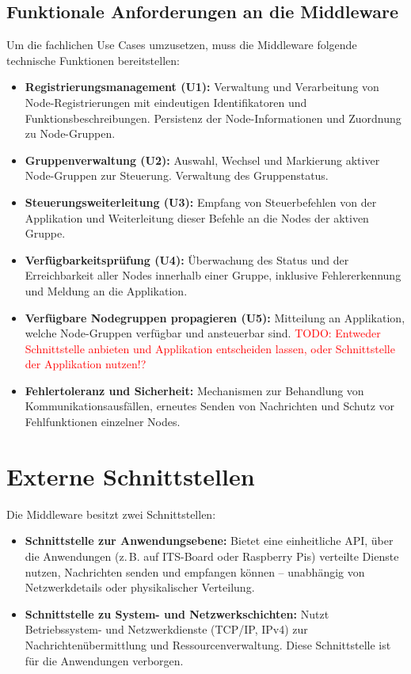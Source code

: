 \subsection{Funktionale Anforderungen an die Middleware}

Um die fachlichen Use Cases umzusetzen, muss die Middleware folgende technische Funktionen bereitstellen:

\begin{itemize}
	\item \textbf{Registrierungsmanagement (U1):}  
	Verwaltung und Verarbeitung von Node-Registrierungen mit eindeutigen Identifikatoren und Funktionsbeschreibungen.  
	Persistenz der Node-Informationen und Zuordnung zu Node-Gruppen.
	
	\item \textbf{Gruppenverwaltung (U2):}  
	Auswahl, Wechsel und Markierung aktiver Node-Gruppen zur Steuerung. Verwaltung des Gruppenstatus.
	
	\item \textbf{Steuerungsweiterleitung (U3):}  
	Empfang von Steuerbefehlen von der Applikation und Weiterleitung dieser Befehle an die Nodes der aktiven Gruppe.
	
	\item \textbf{Verfügbarkeitsprüfung (U4):}  
	Überwachung des Status und der Erreichbarkeit aller Nodes innerhalb einer Gruppe, inklusive Fehlererkennung und Meldung an die Applikation.
	\item \textbf{Verfügbare Nodegruppen propagieren (U5):}  
	Mitteilung an Applikation, welche Node-Gruppen verfügbar und ansteuerbar sind. \textcolor{red}{TODO: Entweder Schnittstelle anbieten und Applikation entscheiden lassen, oder Schnittstelle der Applikation nutzen!?}
	
	\item \textbf{Fehlertoleranz und Sicherheit:}  
	Mechanismen zur Behandlung von Kommunikationsausfällen, erneutes Senden von Nachrichten und Schutz vor Fehlfunktionen einzelner Nodes.
\end{itemize}

\section{Externe Schnittstellen}

Die Middleware besitzt zwei Schnittstellen:

\begin{itemize}
	\item \textbf{Schnittstelle zur Anwendungsebene:}  
	Bietet eine einheitliche API, über die Anwendungen (z.\,B. auf ITS-Board oder Raspberry Pis) verteilte Dienste nutzen, Nachrichten senden und empfangen können – unabhängig von Netzwerkdetails oder physikalischer Verteilung.
	
	\item \textbf{Schnittstelle zu System- und Netzwerkschichten:}  
	Nutzt Betriebssystem- und Netzwerkdienste (TCP/IP, IPv4) zur Nachrichtenübermittlung und Ressourcenverwaltung. Diese Schnittstelle ist für die Anwendungen verborgen.
\end{itemize}